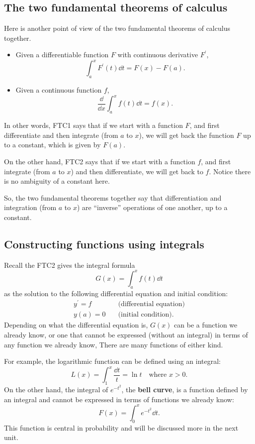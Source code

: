 \subsection{The two fundamental theorems of calculus}
Here is another point of view of the two fundamental theorems of calculus together.
\begin{itemize}
\item Given a differentiable function $F$ with continuous derivative $F^\prime$,
  \[\int_a^xF^\prime(t)\dd t=F(x)-F(a).\]
\item Given a continuous function $f$,
  \[\frac\dd{\dd x}\int_a^xf(t)\dd t=f(x).\]
\end{itemize}
In other words, FTC1 says that if we start with a function $F$, and first differentiate and then integrate (from $a$ to $x$), we will get back the function $F$ up to a constant, which is given by $F(a)$.

On the other hand, FTC2 says that if we start with a function $f$, and first integrate (from $a$ to $x$) and then differentiate, we will get back to $f$. Notice there is no ambiguity of a constant here.

So, the two fundamental theorems together say that differentiation and integration (from $a$ to $x$) are ``inverse'' operations of one another, up to a constant.
\subsection{Constructing functions using integrals}
Recall the FTC2 gives the integral formula \[G(x)=\int_a^xf(t)\dd t\]
as the solution to the following differential equation and initial condition:
\begin{align*}
y^\prime=f\quad & \text{(differential equation)}\\
y(a)=0\quad & \text{(initial condition).}
\end{align*}
Depending on what the differential equation is, $G(x)$ can be a function we already know, or one that cannot be expressed (without an integral) in terms of any function we already know, There are many functions of either kind.

For example, the logarithmic function can be defined using an integral:
\[L(x)=\int_1^x\frac{\dd t}t=\ln t\quad\text{where $x>0$}.\]
On the other hand, the integral of $e^{-t^2}$, the \textbf{bell curve}, is a function defined by an integral and cannot be expressed in terms of functions we already know:
\[F(x)=\int_0^xe^{-t^2}\dd t.\]
This function is central in probability and will be discussed more in the next unit.

